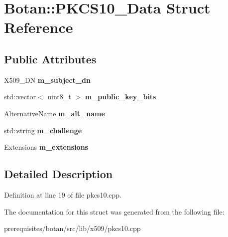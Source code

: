 \hypertarget{struct_botan_1_1_p_k_c_s10___data}{}\section{Botan\+:\+:P\+K\+C\+S10\+\_\+\+Data Struct Reference}
\label{struct_botan_1_1_p_k_c_s10___data}
\subsection*{Public Attributes}
\begin{DoxyCompactItemize}
\item 
\mbox{\label{struct_botan_1_1_p_k_c_s10___data_a6f65e03c67373a6b82c481144849c635}} 
X509\+\_\+\+DN {\bfseries m\+\_\+subject\+\_\+dn}
\item 
\mbox{\label{struct_botan_1_1_p_k_c_s10___data_aee997f8ccad756175d2d2b649a216a9c}} 
std\+::vector$<$ uint8\+\_\+t $>$ {\bfseries m\+\_\+public\+\_\+key\+\_\+bits}
\item 
\mbox{\label{struct_botan_1_1_p_k_c_s10___data_abf41f67d44f689fcb7b7dfc80a1559fc}} 
Alternative\+Name {\bfseries m\+\_\+alt\+\_\+name}
\item 
\mbox{\label{struct_botan_1_1_p_k_c_s10___data_a4a7f4ca5f17ef51405c163b670e384af}} 
std\+::string {\bfseries m\+\_\+challenge}
\item 
\mbox{\label{struct_botan_1_1_p_k_c_s10___data_a3f33a303c1c46e43c6a9a87f34a97adb}} 
Extensions {\bfseries m\+\_\+extensions}
\end{DoxyCompactItemize}


\subsection{Detailed Description}


Definition at line 19 of file pkcs10.\+cpp.



The documentation for this struct was generated from the following file\+:\begin{DoxyCompactItemize}
\item 
prerequisites/botan/src/lib/x509/pkcs10.\+cpp\end{DoxyCompactItemize}
